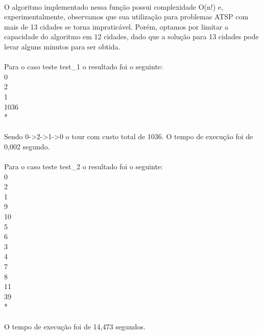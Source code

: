 \documentclass[12pt,a4paper]{article}
\begin{document}
  {\paragraph{} O algoritmo implementado nessa função possui complexidade O(n!) e, experimentalmente, observamos que sua utilização
  para problemas ATSP com mais de 13 cidades se torna impraticável. Porém, optamos por limitar a capacidade do algoritmo em 12 cidades, 
  dado que a solução para 13 cidades pode levar alguns minutos para ser obtida.}
  {\paragraph{} Para o caso teste test\_1 o resultado foi o seguinte:\\ 0 \\ 2 \\ 1 \\ 1036 \\ {*}}
  {\paragraph{} Sendo 0->2->1->0 o tour com custo total de 1036. O tempo de execução foi de 0,002 segundo.}
  {\paragraph{} Para o caso teste test\_2 o resultado foi o seguinte:\\ 0 \\ 2 \\ 1 \\ 9 \\ 10 \\ 5 \\ 6 \\ 3 \\ 4 \\ 7 \\ 8 \\ 11 \\ 39 \\ {*}}
  {\paragraph{} O tempo de execução foi de 14,473 segundos.}
 
 \newpage
\end{document}
